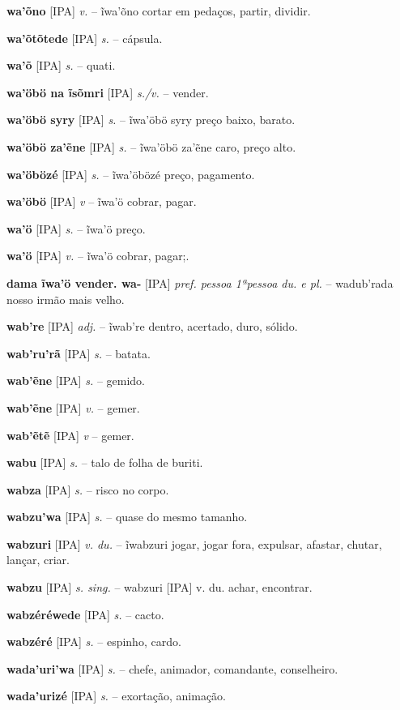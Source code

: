 \textbf{wa'õno} [IPA] \textit{v.} -- ĩwa'õno cortar em pedaços, partir, dividir.

\textbf{wa'õtõtede} [IPA] \textit{s.} -- cápsula.

\textbf{wa'õ} [IPA] \textit{s.} -- quati.

\textbf{wa'öbö na ĩsõmri} [IPA] \textit{s./v.} -- vender.

\textbf{wa'öbö syry} [IPA] \textit{s.} -- ĩwa'öbö syry preço baixo, barato.

\textbf{wa'öbö za'ẽne} [IPA] \textit{s.} -- ĩwa'öbö za'ẽne caro, preço alto.

\textbf{wa'öbözé} [IPA] \textit{s.} -- ĩwa'öbözé preço, pagamento.

\textbf{wa'öbö} [IPA] \textit{v} -- ĩwa'ö cobrar, pagar.

\textbf{wa'ö} [IPA] \textit{s.} -- ĩwa'ö preço.

\textbf{wa'ö} [IPA] \textit{v.} -- ĩwa'ö cobrar, pagar;.

\textbf{dama ĩwa'ö vender. wa-} [IPA] \textit{pref. pessoa 1ªpessoa du. e pl.} -- wadub'rada nosso irmão mais velho.

\textbf{wab're} [IPA] \textit{adj.} -- ĩwab're dentro, acertado, duro, sólido.

\textbf{wab'ru'rã} [IPA] \textit{s.} -- batata.

\textbf{wab'ẽne} [IPA] \textit{s.} -- gemido.

\textbf{wab'ẽne} [IPA] \textit{v.} -- gemer.

\textbf{wab'ẽtẽ} [IPA] \textit{v} -- gemer.

\textbf{wabu} [IPA] \textit{s.} -- talo de folha de buriti.

\textbf{wabza} [IPA] \textit{s.} -- risco no corpo.

\textbf{wabzu'wa} [IPA] \textit{s.} -- quase do mesmo tamanho.

\textbf{wabzuri} [IPA] \textit{v. du.} -- ĩwabzuri jogar, jogar fora, expulsar, afastar, chutar, lançar, criar.

\textbf{wabzu} [IPA] \textit{s. sing.} -- wabzuri [IPA] v. du. achar, encontrar.

\textbf{wabzéréwede} [IPA] \textit{s.} -- cacto.

\textbf{wabzéré} [IPA] \textit{s.} -- espinho, cardo.

\textbf{wada'uri'wa} [IPA] \textit{s.} -- chefe, animador, comandante, conselheiro.

\textbf{wada'urizé} [IPA] \textit{s.} -- exortação, animação.

